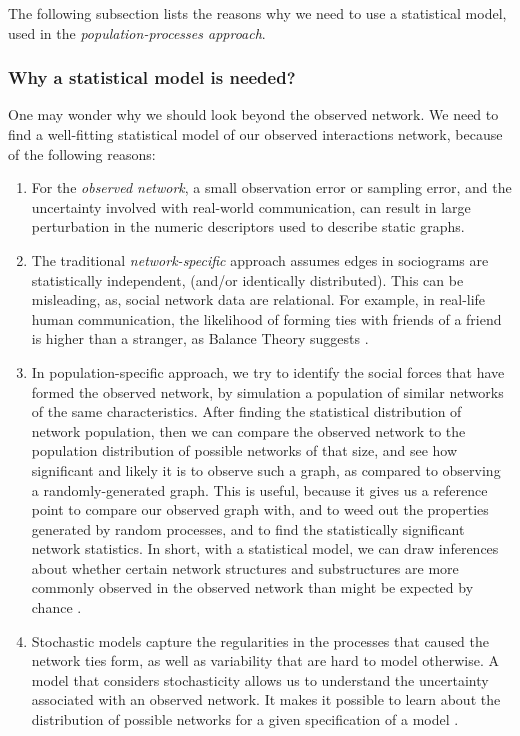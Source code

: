 \documentclass[11pt]{report}
\begin{document}
The following subsection lists the reasons why we need to use a statistical model, used in the \textit{population-processes approach}.

\subsubsection{Why a statistical model is needed?}

One may wonder why we should look beyond the observed network. We need to find a well-fitting statistical model of our observed interactions network, because of the following reasons: 

\begin{enumerate}

\item For the \textit{observed network}, a small observation error or sampling error, and the uncertainty involved with real-world communication, can result in large perturbation in the numeric descriptors used to describe static graphs. 

\item The traditional \textit{network-specific} approach assumes edges in sociograms are statistically independent, (and/or identically distributed). This can be misleading, as, social network data are relational. For example, in real-life human communication, the likelihood of forming ties with friends of a friend is higher than a stranger, as Balance Theory suggests \cite{Heider}. 

\item In population-specific approach, we try to identify the social forces that have formed the observed network, by simulation a population of similar networks of the same characteristics. After finding the statistical distribution of network population, then we can compare the observed network to the population distribution of possible networks of that size, and see how significant and likely it is to observe such a graph, as compared to observing a randomly-generated graph. This is useful, because it gives us a reference point to compare our observed graph with, and to weed out the properties generated by random processes, and to find the statistically significant network statistics. In short, with a statistical model, we can draw inferences about whether certain network structures and substructures are more commonly observed in the observed network than might be expected by chance \cite{Robins}. 

\item Stochastic models capture the regularities in the processes that caused the network ties form, as well as variability that are hard to model otherwise. A model that considers stochasticity allows us to understand the uncertainty associated with an observed network. It makes it possible to learn about the distribution of possible networks for a given specification of a model \cite{Robins}.


\end{enumerate}
\end{document}
